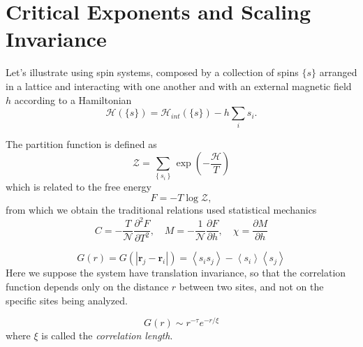 

\section{Critical Exponents and Scaling Invariance}
\label{sec:scaling}

Let's illustrate using spin systems, composed by a collection of spins $\{s\}$
arranged in a lattice and interacting with one another and with an
external magnetic field $h$ according to a Hamiltonian
\begin{equation}
    \mathcal{H} \left(\{s\}\right)=
    \mathcal{H}_{int}\left(\{s\}\right) - h\sum_i s_i.
\end{equation}

The partition function is defined as 
\begin{equation}
    \mathcal{Z}=
    \sum_{\left\{ s_{i}\right\} }\exp\left(-\frac{\mathcal{H}}{T}\right)
\end{equation}
which is related to the free energy
\begin{equation}
    F=-T\log\mathcal{Z},
\end{equation}
from which we obtain the traditional relations used statistical mechanics
\begin{equation}
    C=-\frac{T}{\mathcal{N}}\frac{\partial^{2}F}{\partial T^{2}},
    \,\,\,\,\,\,
    M=-\frac{1}{\mathcal{N}}\frac{\partial F}{\partial h},
    \,\,\,\,\,\,
    \chi=\frac{\partial M}{\partial h}
\end{equation}

\begin{equation}
    G\left(r\right)=
    G\left(\left|\mathbf{r}_{j}-\mathbf{r}_{i}\right|\right)=
    \left\langle s_{i}s_{j}\right\rangle -
    \left\langle s_{i}\right\rangle \left\langle s_{j}\right\rangle 
\end{equation}
Here we suppose the system have translation invariance, so that the correlation
function depends only on the distance $r$ between two sites, and not on the
specific sites being analyzed.

\begin{equation}
    G\left(r\right)\sim r^{-\tau}e^{-r/\xi}
\end{equation}
where $\xi$ is called the \textit{correlation length}.

